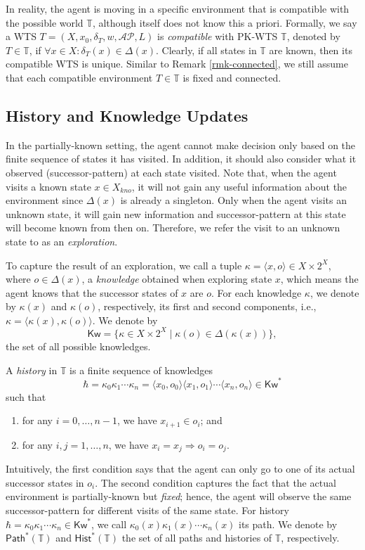 \documentclass{ifacconf}
\def \AP{\mathcal{AP}}
\def \<{\langle}
\def \>{\rangle}
\def \path{\textsf{Path}}
\def \T{\mathbb{T}}
\begin{document}
In reality, the agent is moving in a specific environment that is compatible with the possible world $\T$, although itself does not know this a priori. 
Formally,  we say a WTS $T=(X,x_0,\delta_T,w,\AP,L)$ is \emph{compatible} with PK-WTS  $\T$, denoted by $T\in\T$, if  $\forall x\in X: \delta_T(x)\in\Delta(x)$. 
Clearly, if all states in $\T$ are known, then its compatible WTS is unique. 
Similar to Remark \ref{rmk-connected}, we still assume that each compatible environment $T\in\T$ is fixed and connected.

\subsection{History and Knowledge Updates}
In the partially-known setting, the agent cannot make decision only based on the finite sequence of states it has visited. In addition, it should also consider what it observed (successor-pattern) at each state visited. Note that, when the agent visits a known state $x\in X_{kno}$, it will not gain any useful information about the environment since $\Delta(x)$ is already a singleton.  Only when  the agent visits an unknown state, it will gain new information and successor-pattern at this state will become known from then on. Therefore, we refer the visit to an unknown state to as an \emph{exploration}. 

To capture the result of an exploration, 
we call a tuple $\kappa=\< x,o\>\in X\times 2^X$, where $o \in\Delta(x)$, 
a \emph{knowledge} obtained when exploring state $x$, which means the agent knows that the successor states of $x$ are $o$.   
For each knowledge $\kappa$, we denote by $\kappa(x)$ and $\kappa(o)$, respectively, its first and second components, i.e., $\kappa=\<\kappa(x),\kappa(o)\>$. 
We denote by 
\begin{equation}\label{eq:know-domain}
\textsf{Kw}=\{  \kappa \in X\times 2^X \mid  \kappa(o) \in\Delta(\kappa(x))\}, 
\end{equation}
the set of all possible knowledges. 

A \emph{history} in $\T$ is a finite sequence of knowledges  
\begin{equation}\label{eq:hist}
\hbar= \kappa_0\kappa_1\cdots\kappa_n=  \<x_0,o_0\>\<x_1,o_1\>\cdots\<x_n,o_n\> \in \textsf{Kw}^*
\end{equation}
such that 
\begin{enumerate} 
    \item 
    for any $i=0,\dots, n-1$, we have $x_{i+1}\in o_i$; and 
    \item 
    for any $i,j=1,\dots,n$, we have $x_i=x_j\Rightarrow o_i=o_j$.
\end{enumerate}
Intuitively, the first condition says that the agent can only go to one of its actual successor states in $o_i$. 
The second condition captures the fact that the actual environment is partially-known but \emph{fixed}; hence, the agent will observe the same successor-pattern for different visits of the same state. 
For history $\hbar=\kappa_0\kappa_1\cdots\kappa_n\in\textsf{Kw}^*$, we call $\kappa_0(x)\kappa_1(x)\cdots\kappa_n(x)$ its path. 
We denote by $\path^*(\T)$ and $\textsf{Hist}^*(\T)$ the set of all paths and histories of $\T$, respectively. 
\end{document}
